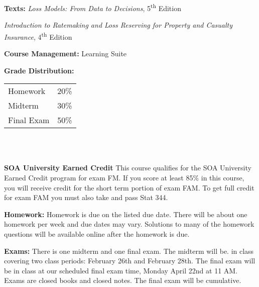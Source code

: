 \documentclass[12pt]{article}
\begin{document}
\vspace{.5 cm}

\textbf { Texts:} \emph{Loss Models: From Data to Decisions},  5\textsuperscript{th} Edition

\hspace{1 cm} \small{\emph{Introduction to Ratemaking and Loss Reserving for Property and Casualty Insurance}, 4\textsuperscript{th} Edition }

\vspace{.5 cm}


\textbf{Course Management:} Learning Suite \\

\vspace{.5 cm}

\textbf { Grade Distribution:} \\
\hspace*{40mm}
\begin{tabular}{ l l }
Homework & 20\% \\
Midterm & 30\% \\
Final Exam  & 50\% 
\end{tabular} \\\\

\vspace{.5 cm}


\textbf{SOA University Earned Credit}
This course qualifies for the SOA University Earned Credit program for exam FM. If you score at least 85\% in this course, you will receive credit for the short term portion of exam FAM. To get full credit for exam FAM you must also take and pass Stat 344. 

\newpage

\textbf { Homework:}
Homework is due on the listed due date. There will be about one homework per week and due dates may vary. Solutions to many of the homework questions will be available online after the homework is due. 

\vspace{.5 cm}


\textbf { Exams:}
There is one midterm and one final exam. The midterm will be. in class covering two class periods: February 26th and February 28th. The final exam will be in class at our scheduled final exam time, Monday April 22nd at 11 AM. Exams are closed books and closed notes. The final exam will be cumulative. 

\vspace{.5 cm}
\end{document}
